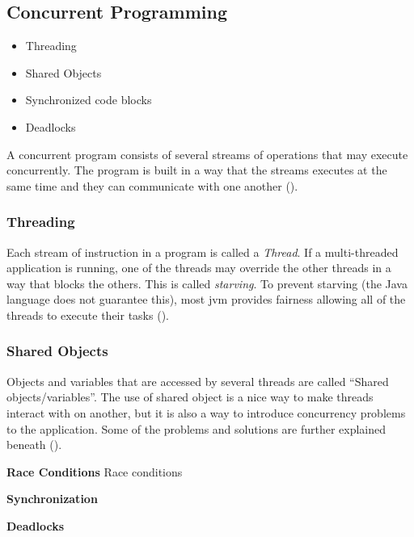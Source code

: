 \subsection{Concurrent Programming}
\begin{itemize}
    \item Threading
    \item Shared Objects
    \item Synchronized code blocks
    \item Deadlocks
\end{itemize}

A concurrent program consists of several streams of operations that may execute concurrently. The program is built in a way that the streams executes at the same time and they can communicate with one another (\cite{cartwright2000}).

\subsubsection{Threading}
\label{sec:threading}
Each stream of instruction in a program is called a \textit{Thread}. If a multi-threaded application is running, one of the threads may override the other threads in a way that blocks the others. This is called \textit{starving}. To prevent starving (the Java language does not guarantee this), most \acrshort{jvm} provides fairness allowing all of the threads to execute their tasks (\cite{cartwright2000}).

\subsubsection{Shared Objects}
\label{sec:sharedobj}
Objects and variables that are accessed by several threads are called ``Shared objects/variables''. The use of shared object is a nice way to make threads interact with on another, but it is also a way to introduce concurrency problems to the application. Some of the problems and solutions are further explained beneath (\cite{downey2008}).

\textbf{Race Conditions}
\label{sec:raisedcond}
Race conditions 

\textbf{Synchronization}
\label{sec:synchronization}

\textbf{Deadlocks}
\label{sec:deadlock}